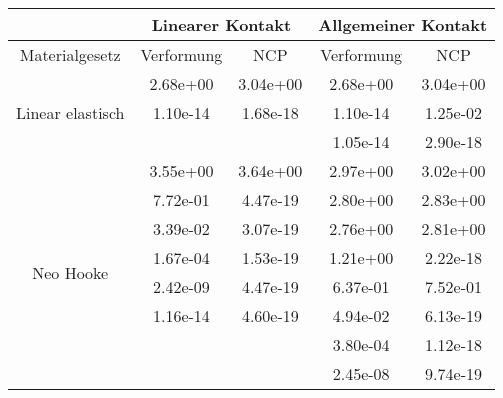 \begin{table} 
\centering 
\begin{tabular}{c|cc|cc|} 
\cline{2-5} 
 & \multicolumn{2}{|c|}{Linearer Kontakt} & \multicolumn{2}{|c|}{Allgemeiner Kontakt} \\ 
\hline 
\multicolumn{1}{|c|}{Materialgesetz} & \multicolumn{1}{c|}{Verformung} & \multicolumn{1}{c|}{NCP} & \multicolumn{1}{c|}{Verformung} & \multicolumn{1}{c|}{NCP} \\ 
\hline 
\multicolumn{1}{|c|}{\multirow{3}{*}{Linear elastisch}} &\multicolumn{1}{|c|}{  2.68e+00} & \multicolumn{1}{|c|}{  3.04e+00} & \multicolumn{1}{|c|}{  2.68e+00} & \multicolumn{1}{|c|}{  3.04e+00} \\ 
\multicolumn{1}{|c|}{} & \multicolumn{1}{|c|}{  1.10e-14} & \multicolumn{1}{|c|}{  1.68e-18} & \multicolumn{1}{|c|}{  1.10e-14} & \multicolumn{1}{|c|}{  1.25e-02} \\ 
\multicolumn{1}{|c|}{} & \multicolumn{1}{|c|}{} & \multicolumn{1}{|c|}{} & \multicolumn{1}{|c|}{  1.05e-14} & \multicolumn{1}{|c|}{  2.90e-18} \\ 
\hline 
\multicolumn{1}{|c|}{\multirow{9}{*}{Neo Hooke}} &\multicolumn{1}{|c|}{  3.55e+00} & \multicolumn{1}{|c|}{  3.64e+00} & \multicolumn{1}{|c|}{  2.97e+00} & \multicolumn{1}{|c|}{  3.02e+00} \\ 
\multicolumn{1}{|c|}{} & \multicolumn{1}{|c|}{  7.72e-01} & \multicolumn{1}{|c|}{  4.47e-19} & \multicolumn{1}{|c|}{  2.80e+00} & \multicolumn{1}{|c|}{  2.83e+00} \\ 
\multicolumn{1}{|c|}{} & \multicolumn{1}{|c|}{  3.39e-02} & \multicolumn{1}{|c|}{  3.07e-19} & \multicolumn{1}{|c|}{  2.76e+00} & \multicolumn{1}{|c|}{  2.81e+00} \\ 
\multicolumn{1}{|c|}{} & \multicolumn{1}{|c|}{  1.67e-04} & \multicolumn{1}{|c|}{  1.53e-19} & \multicolumn{1}{|c|}{  1.21e+00} & \multicolumn{1}{|c|}{  2.22e-18} \\ 
\multicolumn{1}{|c|}{} & \multicolumn{1}{|c|}{  2.42e-09} & \multicolumn{1}{|c|}{  4.47e-19} & \multicolumn{1}{|c|}{  6.37e-01} & \multicolumn{1}{|c|}{  7.52e-01} \\ 
\multicolumn{1}{|c|}{} & \multicolumn{1}{|c|}{  1.16e-14} & \multicolumn{1}{|c|}{  4.60e-19} & \multicolumn{1}{|c|}{  4.94e-02} & \multicolumn{1}{|c|}{  6.13e-19} \\ 
\multicolumn{1}{|c|}{} & \multicolumn{1}{|c|}{} & \multicolumn{1}{|c|}{} & \multicolumn{1}{|c|}{  3.80e-04} & \multicolumn{1}{|c|}{  1.12e-18} \\ 
\multicolumn{1}{|c|}{} & \multicolumn{1}{|c|}{} & \multicolumn{1}{|c|}{} & \multicolumn{1}{|c|}{  2.45e-08} & \multicolumn{1}{|c|}{  9.74e-19} \\ 

\end{tabular}
\end{table}
